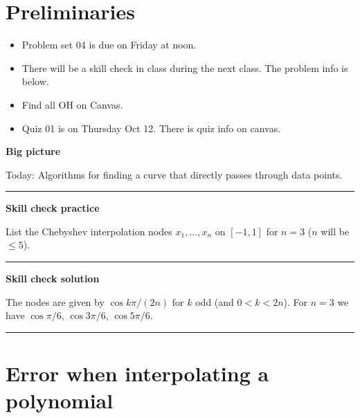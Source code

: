 \documentclass[12pt,letterpaper,noanswers]{exam}
\begin{document}
 \pdfpageheight 11in 
  \pdfpagewidth 8.5in

\noindent 

\section*{Preliminaries}

\begin{itemize}
\itemsep0pt
\item Problem set 04 is due on Friday at noon.
\item There will be a skill check in class during the next class.  The problem info is below.
\item Find all OH on Canvas.
\item Quiz 01 is on Thursday Oct 12.  There is quiz info on canvas.
\end{itemize}



\noindent\textbf{Big picture}

Today: Algorithms for finding a curve that directly passes through data points.

\vspace{0.2cm}
\hrule
\vspace{0.2cm}

\noindent \textbf{Skill check practice}

List the Chebyshev interpolation nodes $x_1, ..., x_n$ on $[-1,1]$ for $n = 3$ ($n$ will be $\leq 5$).


\vspace{0.2cm}
\hrule
\vspace{0.2cm}

\noindent \textbf{Skill check solution}

The nodes are given by $\cos k\pi/(2n)$ for $k$ odd (and $0< k < 2n$).  For $n=3$ we have $\cos \pi/6$, $\cos 3\pi/6$, $\cos 5\pi/6$.



\vspace{0.2cm}
\hrule
\vspace{0.2cm}


\section*{Error when interpolating a polynomial}
\end{document}
